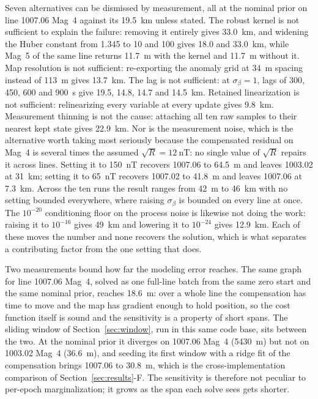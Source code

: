 \documentclass{IEEEtaes}
\begin{document}
Seven alternatives can be dismissed by measurement, all at the nominal prior on
line 1007.06 Mag~4 against its \SI{19.5}{\kilo\meter} unless stated. The robust
kernel is not sufficient to explain the failure: removing it entirely gives
\SI{33.0}{\kilo\meter}, and widening the Huber constant from \num{1.345} to
\num{10} and \num{100} gives \num{18.0} and \SI{33.0}{\kilo\meter}, while Mag~5
of the same line returns \SI{11.7}{\meter} with the kernel and \SI{11.7}{\meter}
without it. Map resolution is not sufficient: re-exporting the anomaly grid at
\SI{34}{\meter} spacing instead of \SI{113}{\meter} gives \SI{13.7}{\kilo\meter}.
The lag is not sufficient: at $\sigma_{\beta}=1$, lags of \num{300},
\num{450}, \num{600} and \SI{900}{\second} give \num{19.5}, \num{14.8},
\num{14.7} and \SI{14.5}{\kilo\meter}. Retained linearization is not
sufficient: relinearizing every variable at every update gives
\SI{9.8}{\kilo\meter}. Measurement thinning is not the cause: attaching all ten
raw samples to their nearest kept state gives \SI{22.9}{\kilo\meter}. Nor is the
measurement noise, which is the alternative worth taking most seriously because
the compensated residual on Mag~4 is several times the assumed
$\sqrt{R}=\SI{12}{\nano\tesla}$: no single value of $\sqrt{R}$ repairs
it across lines. Setting it to \SI{150}{\nano\tesla} recovers 1007.06 to
\SI{64.5}{\meter} and leaves 1003.02 at \SI{31}{\kilo\meter}; setting it to
\SI{65}{\nano\tesla} recovers 1007.02 to \SI{41.8}{\meter} and leaves 1007.06
at \SI{7.3}{\kilo\meter}. Across the ten runs the result ranges from
\SI{42}{\meter} to \SI{46}{\kilo\meter} with no setting bounded everywhere,
where raising $\sigma_{\beta}$ is bounded on every line at once. The
$10^{-20}$ conditioning floor on the process noise is likewise not doing the
work: raising it to $10^{-16}$ gives \SI{49}{\kilo\meter} and lowering it to
$10^{-24}$ gives \SI{12.9}{\kilo\meter}. Each of these moves the number and none
recovers the solution, which is what separates a contributing factor from the
one setting that does.

Two measurements bound how far the modeling error reaches. The same graph for
line 1007.06 Mag~4, solved as one full-line batch from the same zero start and
the same nominal prior, reaches \SI{18.6}{\meter}: over a whole line the
compensation has time to move and the map has gradient enough to hold position,
so the cost function itself is sound and the sensitivity is a property of short
spans. The sliding window of Section~\ref{sec:window}, run in this same code
base, sits between the two. At the nominal prior it diverges on 1007.06 Mag~4
(\SI{5430}{\meter}) but not on 1003.02 Mag~4 (\SI{36.6}{\meter}), and seeding its
first window with a ridge fit of the compensation brings 1007.06 to
\SI{30.8}{\meter}, which is the cross-implementation comparison of
Section~\ref{sec:results}-F. The sensitivity is therefore not peculiar to
per-epoch marginalization; it grows as the span each solve sees gets shorter.
\end{document}
